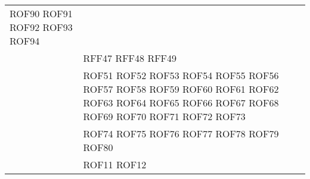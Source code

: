 \documentclass[../DefinizioneDiProdotto_v3.0.0.tex]{subfiles}
\begin{document}
\begin{longtable}{p{8.5cm}!{\VRule[1pt]}p{2.5cm}}
	ROF90 \newline
	ROF91 \newline
	ROF92 \newline
	ROF93 \newline
	ROF94 \\
	                                             & RFF47 \newline
	RFF48 \newline
	RFF49 \\
	                                         & ROF51 \newline
	ROF52 \newline
	ROF53 \newline
	ROF54 \newline
	ROF55 \newline
	ROF56 \newline
	ROF57 \newline
	ROF58 \newline
	ROF59 \newline
	ROF60 \newline
	ROF61 \newline
	ROF62 \newline
	ROF63 \newline
	ROF64 \newline
	ROF65 \newline
	ROF66 \newline
	ROF67 \newline
	ROF68 \newline
	ROF69 \newline
	ROF70 \newline
	ROF71 \newline
	ROF72 \newline
	ROF73 \\
	                                            & ROF74 \newline
	ROF75 \newline
	ROF76 \newline
	ROF77 \newline
	ROF78 \newline
	ROF79 \newline
	ROF80 \\
	                                         & ROF11 \newline
	ROF12 \newline

\end{longtable}
\end{document}
